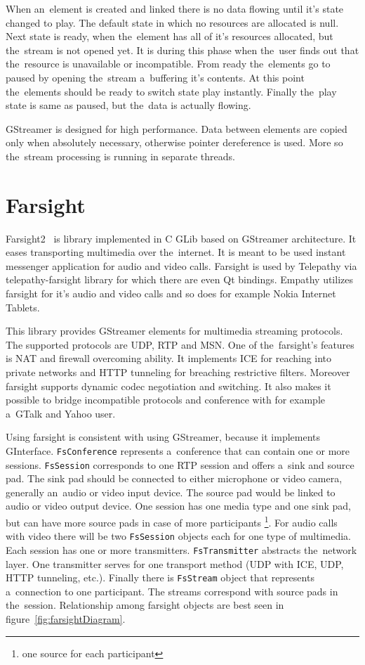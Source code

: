 When an~element is created and linked there is no data flowing until it's state changed to play. The default state in which no resources are allocated is null. Next state is ready, when the~element has all of it's resources allocated, but the~stream is not opened yet. It is during this phase when the~user finds out that the~resource is unavailable or incompatible. From ready the~elements go to paused by opening the~stream a~buffering it's contents. At this point the~elements should be ready to switch state play instantly. Finally the~play state is same as paused, but the~data is actually flowing. 

GStreamer is designed for high performance. Data between elements are copied only when absolutely necessary, otherwise pointer dereference is used. More so the~stream processing is running in separate threads.  

\section{Farsight}
Farsight2~\cite{farsight} is library implemented in C GLib based on GStreamer architecture. It eases transporting multimedia over the~internet. It is meant to be used instant messenger application for audio and video calls. Farsight is used by Telepathy via telepathy-farsight library for which there are even Qt bindings. Empathy utilizes farsight for it's audio and video calls and so does for example Nokia Internet Tablets.

This library provides GStreamer elements for multimedia streaming protocols. The supported protocols are UDP, RTP and MSN. One of the~farsight's features is NAT and firewall overcoming ability. It implements ICE for reaching into private networks and HTTP tunneling for breaching restrictive filters. Moreover farsight supports dynamic codec negotiation and switching. It also makes it possible to bridge incompatible protocols and conference with for example a~GTalk and Yahoo user. 

Using farsight is consistent with using GStreamer, because it implements GInterface. \verb|FsConference| represents a~conference that can contain one or more sessions. \verb|FsSession| corresponds to one RTP session and offers a~sink and source pad. The sink pad should be connected to either microphone or video camera, generally an~audio or video input device. The source pad would be linked to audio or video output device. One session has one media type and one sink pad, but can have more source pads in case of more participants \footnote{one source for each participant}. For audio calls with video there will be two \verb|FsSession| objects each for one type of multimedia. Each session has one or more transmitters. \verb|FsTransmitter| abstracts the~network layer. One transmitter serves for one transport method (UDP with ICE, UDP, HTTP tunneling, etc.). Finally there is \verb|FsStream| object that represents a~connection to one participant. The streams correspond with source pads in the~session. Relationship among farsight objects are best seen in figure~\ref{fig:farsightDiagram}.

